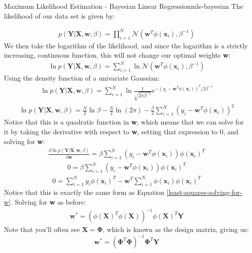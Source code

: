 \begin{derivation}{Maximum Likelihood Estimation - Bayesian Linear Regression}{mle-bayesian}
    The likelihood of our data set is given by:

    \begin{align*}
        p(\textbf{Y} | \textbf{X}, \textbf{w}, \beta) = \prod_{i=1}^{N} \mathcal{N}(\textbf{w}^{T}\phi(\textbf{x}_{i}), \beta^{-1})
    \end{align*}
    We then take the logarithm of the likelihood, and since the logarithm is a strictly increasing, continuous function, this will not change our optimal weights \textbf{w}:
    \begin{align*}
        \ln{p(\textbf{Y} | \textbf{X}, \textbf{w}, \beta)} = \sum_{i=1}^{N} \ln{\mathcal{N}(\textbf{w}^{T}\phi(\textbf{x}_{i}), \beta^{-1})}
    \end{align*}
    Using the density function of a univariate Gaussian:
    \begin{align*}
        \ln{p(\textbf{Y} | \textbf{X}, \textbf{w}, \beta)} = \sum_{i=1}^{N} \ln{\frac{1}{\sqrt{2\pi\beta^{-1}}} e^{-(y_{i} - \textbf{w}^{T}\phi(\textbf{x}_{i}))^2 / 2\beta^{-1}}}
    \end{align*}
    \begin{align*}
        \ln{p(\textbf{Y} | \textbf{X}, \textbf{w}, \beta)} = \frac{N}{2}\ln{\beta} - \frac{N}{2}\ln{(2\pi)} - \frac{\beta}{2} \sum_{i=1}^{N} (y_{i} - \textbf{w}^{T}\phi(\textbf{x}_{i}))^2
    \end{align*}
    Notice that this is a quadratic function in \textbf{w}, which means that we can solve for it by taking the derivative with respect to \textbf{w}, setting that expression to 0, and solving for \textbf{w}:
    \begin{align*}
        \frac{\partial \ln{p(\textbf{Y} | \textbf{X}, \textbf{w}, \beta)}}{\partial \textbf{w}} = \beta \sum_{i=1}^{N} (y_{i} - \textbf{w}^{T}\phi(\textbf{x}_{i}))\phi(\textbf{x}_{i})^{T}
    \end{align*}
    \begin{align*}
        0 = \beta \sum_{i=1}^{N} (y_{i} - \textbf{w}^{T}\phi(\textbf{x}_{i}))\phi(\textbf{x}_{i})^{T}
    \end{align*}
    \begin{align*}
        0 = \sum_{i=1}^{N} y_{i}\phi(\textbf{x}_{i})^{T} - \textbf{w}^{T} \sum_{i=1}^{N} \phi(\textbf{x}_{i})\phi(\textbf{x}_{i})^{T}
    \end{align*}
    Notice that this is exactly the same form as Equation \ref{least-squares-solving-for-w}. Solving for \textbf{w} as before:
    \begin{align*}
        \textbf{w}^{*} = (\phi(\textbf{X})^{T}\phi(\textbf{X}))^{-1}\phi(\textbf{X})^{T}\textbf{Y}
    \end{align*}
    Note that you'll often see $\textbf{X} = \boldsymbol{\Phi}$, which is known as the design matrix, giving us:
    \begin{equation} \label{bayesian-solved-for-w}
        \textbf{w}^{*} = (\boldsymbol{\Phi}^{T}\boldsymbol{\Phi})^{-1}\boldsymbol{\Phi}^{T}\textbf{Y}
    \end{equation}
\end{derivation}


